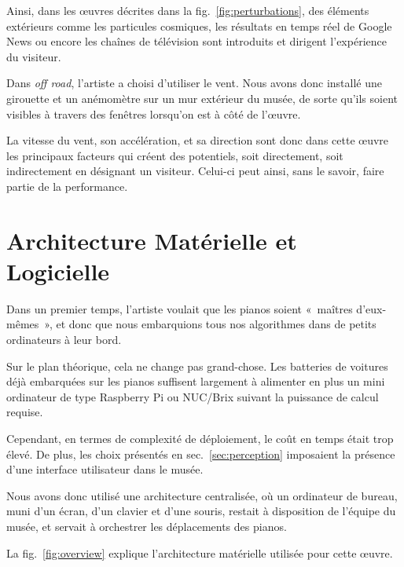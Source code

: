 \documentclass[french,A4paper,]{book}
\begin{document}
Ainsi, dans les œuvres décrites dans la fig.~\ref{fig:perturbations},
des éléments extérieurs comme les particules cosmiques, les résultats en
temps réel de Google News ou encore les chaînes de télévision sont
introduits et dirigent l'expérience du visiteur.

Dans \emph{off road}, l'artiste a choisi d'utiliser le vent. Nous avons
donc installé une girouette et un anémomètre sur un mur extérieur du
musée, de sorte qu'ils soient visibles à travers des fenêtres lorsqu'on
est à côté de l'œuvre.

La vitesse du vent, son accélération, et sa direction sont donc dans
cette œuvre les principaux facteurs qui créent des potentiels, soit
directement, soit indirectement en désignant un visiteur. Celui-ci peut
ainsi, sans le savoir, faire partie de la performance.

\section{Architecture Matérielle et
Logicielle}\label{architecture-matuxe9rielle-et-logicielle}

Dans un premier temps, l'artiste voulait que les pianos soient «~maîtres
d'eux-mêmes~», et donc que nous embarquions tous nos algorithmes dans de
petits ordinateurs à leur bord.

Sur le plan théorique, cela ne change pas grand-chose. Les batteries de
voitures déjà embarquées sur les pianos suffisent largement à alimenter
en plus un mini ordinateur de type Raspberry Pi ou NUC/Brix suivant la
puissance de calcul requise.

Cependant, en termes de complexité de déploiement, le coût en temps
était trop élevé. De plus, les choix présentés en
sec.~\ref{sec:perception} imposaient la présence d'une interface
utilisateur dans le musée.

Nous avons donc utilisé une architecture centralisée, où un ordinateur
de bureau, muni d'un écran, d'un clavier et d'une souris, restait à
disposition de l'équipe du musée, et servait à orchestrer les
déplacements des pianos.

La fig.~\ref{fig:overview} explique l'architecture matérielle utilisée
pour cette œuvre.
\end{document}
